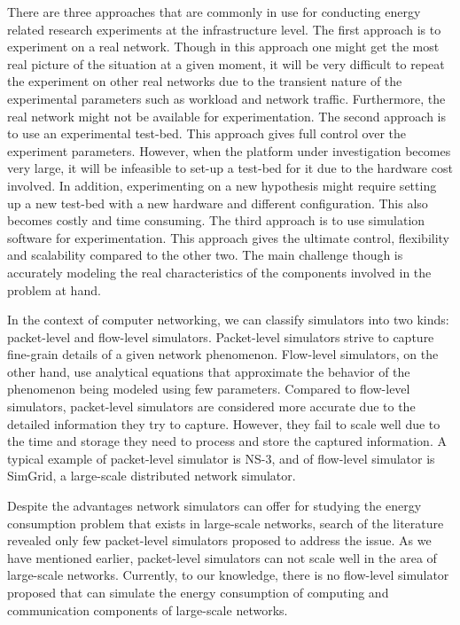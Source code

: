 There are three approaches that are commonly in use for conducting energy related research experiments at the infrastructure level. The first approach is to experiment on a real network. Though in this approach one might get the most real picture of the situation at a given moment, it will be very difficult to repeat the experiment on other real networks due to the transient nature of the experimental parameters such as workload and network traffic.  Furthermore, the real network might not be available for experimentation. The second approach is to use an experimental test-bed. This approach gives full control over the experiment parameters. However, when the platform under investigation becomes very large, it will be infeasible to set-up a test-bed for it due to the hardware cost involved. In addition, experimenting on a new hypothesis might require setting up a new test-bed with a new hardware and different configuration. This also becomes costly and time consuming. The third approach is to use simulation software for experimentation. This approach gives the ultimate control, flexibility and scalability compared to the other two. The main challenge though is accurately modeling the real characteristics of the components involved in the problem at hand.

In the context of computer networking, we can classify simulators into two kinds: packet-level and flow-level simulators. Packet-level simulators strive to capture fine-grain details of a given network phenomenon. Flow-level simulators, on the other hand, use analytical equations that approximate the behavior of the phenomenon being modeled using few parameters. Compared to flow-level simulators, packet-level simulators are considered more accurate due to the detailed information they try to capture. However, they fail to scale well due to the time and storage they need to process and store the captured information. A typical example of packet-level simulator is NS-3, and of flow-level simulator is SimGrid, a large-scale distributed network simulator. 

Despite the advantages network simulators can offer for studying the energy consumption problem that exists in large-scale networks, search of the literature revealed only few packet-level simulators proposed to address the issue. As we have mentioned earlier, packet-level simulators can not scale well in the area of large-scale networks. Currently, to our knowledge, there is no flow-level simulator proposed that can simulate the energy consumption of computing and communication components of large-scale networks. 

